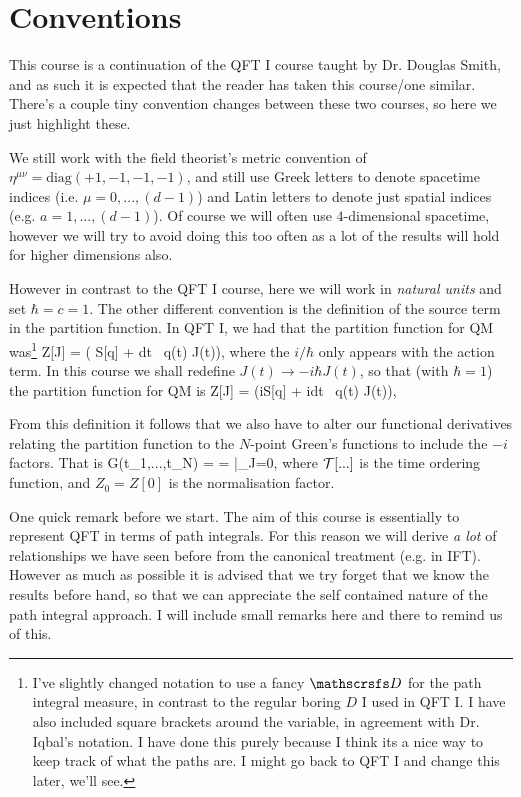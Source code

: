 \chapter{Conventions}

This course is a continuation of the QFT I course taught by Dr. Douglas Smith, and as such it is expected that the reader has taken this course/one similar. There's a couple tiny convention changes between these two courses, so here we just highlight these. 

We still work with the field theorist's metric convention of $\eta^{\mu\nu} = \text{diag}(+1,-1,-1,-1)$, and still use Greek letters to denote spacetime indices (i.e. $\mu=0,...,(d-1)$) and Latin letters to denote just spatial indices (e.g. $a=1,...,(d-1)$). Of course we will often use $4$-dimensional spacetime, however we will try to avoid doing this too often as a lot of the results will hold for higher dimensions also. 

However in contrast to the QFT I course, here we will work in \textit{natural units} and set $\hbar=c=1$. The other different convention is the definition of the source term in the partition function. In QFT I, we had that the partition function for QM was\footnote{I've slightly changed notation to use a fancy $\pD$ for the path integral measure, in contrast to the regular boring $D$ I used in QFT I. I have also included square brackets around the variable, in agreement with Dr. Iqbal's notation. I have done this purely because I think its a nice way to keep track of what the paths are. I might go back to QFT I and change this later, we'll see.}
\bse 
    Z[J] = \cN \int [\pD q] \exp\bigg( S[q] + \int dt \, q(t) J(t)\bigg),
\ese 
where the $i/\hbar$ only appears with the action term. In this course we shall redefine $J(t) \to -i\hbar J(t)$, so that (with $\hbar=1$) the partition function for QM is 
\be 
\label{eqn:QMPathIntegral}
    Z[J] = \cN \int [\pD q] \exp\bigg(iS[q] + i\int dt \, q(t) J(t)\bigg),
\ee

From this definition it follows that we also have to alter our functional derivatives relating the partition function to the $N$-point Green's functions to include the $-i$ factors. That is
\bse 
    G(t_1,...,t_N) = \cT[q(t_1)...q(t_N)] =   \bigg|_{J=0},
\ese 
where $\mathcal{T}[...]$ is the time ordering function, and $Z_0 = Z[0]$ is the normalisation factor.

\br 
    One quick remark before we start. The aim of this course is essentially to represent QFT in terms of path integrals. For this reason we will derive \textit{a lot} of relationships we have seen before from the canonical treatment (e.g. in IFT). However as much as possible it is advised that we try forget that we know the results before hand, so that we can appreciate the self contained nature of the path integral approach. I will include small remarks here and there to remind us of this.  
\er 